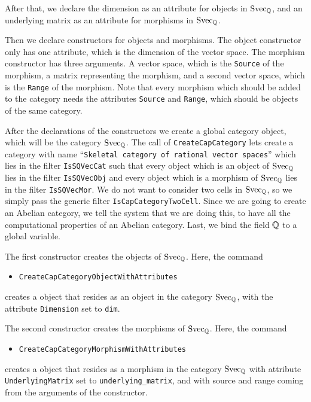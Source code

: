 After that, we declare the dimension as an attribute for objects in $\mathrm{Svec}_{\mathbb{Q}}$,
and an underlying matrix as an attribute for morphisms in $\mathrm{Svec}_{\mathbb{Q}}$.

Then we declare constructors
for objects and morphisms. The object constructor only has one attribute, which is the dimension of the vector space.
The morphism constructor has three arguments. A vector space, which is the \texttt{Source} of the morphism, a matrix
representing the morphism, and a second vector space, which is the \texttt{Range} of the morphism. Note that every morphism
which should be added to the category needs the \GAP attributes \texttt{Source} and \texttt{Range}, which should be
objects of the same category.

After the declarations of the constructors we create a global category \GAP object, which will be the category $\mathrm{Svec}_{\mathbb{Q}}$.
The call of \texttt{CreateCapCategory} lets \CapPkg create a category with name
``\texttt{Skeletal category of rational vector spaces}'' which lies in the filter \texttt{IsSQVecCat}
such that every \GAP object which is an object of $\mathrm{Svec}_{\mathbb{Q}}$ lies in the filter \texttt{IsSQVecObj}
and every \GAP object which is a morphism of $\mathrm{Svec}_{\mathbb{Q}}$ lies in the filter \texttt{IsSQVecMor}.
We do not want to consider two cells in $\mathrm{Svec}_{\mathbb{Q}}$, so we simply pass the generic filter \texttt{IsCapCategoryTwoCell}.
Since we are going to create an Abelian category, we tell the system that we are doing this, to have all the computational
properties of an Abelian category.
Last, we bind the field $\mathbb{Q}$ to a global variable.



The first constructor creates the objects of $\mathrm{Svec}_{\mathbb{Q}}$.
Here, the \CapPkg command
\begin{itemize}
  \item \texttt{CreateCapCategoryObjectWithAttributes}
\end{itemize}
creates a \GAP object that resides as an object in the category
$\mathrm{Svec}_{\mathbb{Q}}$, with the attribute \texttt{Dimension} set to \texttt{dim}.

The second constructor creates the morphisms of $\mathrm{Svec}_{\mathbb{Q}}$.
Here, the \CapPkg command
\begin{itemize}
  \item \texttt{CreateCapCategoryMorphismWithAttributes}
\end{itemize}
creates a \GAP object that resides as a morphism in the category
$\mathrm{Svec}_{\mathbb{Q}}$ with attribute \texttt{UnderlyingMatrix} set to \texttt{underlying\_matrix},
and with source and range coming from the arguments of the constructor.

